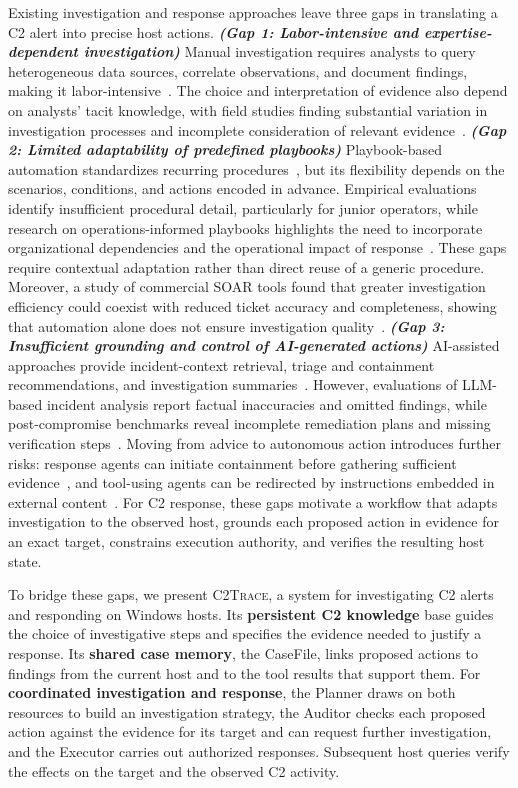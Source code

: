 \documentclass[pdflatex,sn-basic]{sn-jnl}
\newcommand{\system}{\textsc{C2Trace}\xspace}
\begin{document}
Existing investigation and response approaches leave three gaps in translating a C2 alert into precise host actions. \textbf{\textit{(Gap 1: Labor-intensive and expertise-dependent investigation)}} Manual investigation requires analysts to query heterogeneous data sources, correlate observations, and document findings, making it labor-intensive~\citep{bridges2023}. The choice and interpretation of evidence also depend on analysts' tacit knowledge, with field studies finding substantial variation in investigation processes and incomplete consideration of relevant evidence~\citep{kersten2023structure,kersten2025field}. \textbf{\textit{(Gap 2: Limited adaptability of predefined playbooks)}} Playbook-based automation standardizes recurring procedures~\citep{cacao2023}, but its flexibility depends on the scenarios, conditions, and actions encoded in advance. Empirical evaluations identify insufficient procedural detail, particularly for junior operators, while research on operations-informed playbooks highlights the need to incorporate organizational dependencies and the operational impact of response~\citep{stevens2022ready,shaked2023operations}. These gaps require contextual adaptation rather than direct reuse of a generic procedure. Moreover, a study of commercial SOAR tools found that greater investigation efficiency could coexist with reduced ticket accuracy and completeness, showing that automation alone does not ensure investigation quality~\citep{bridges2023}. \textbf{\textit{(Gap 3: Insufficient grounding and control of AI-generated actions)}} AI-assisted approaches provide incident-context retrieval, triage and containment recommendations, and investigation summaries~\citep{guided-response2025,kramer2025}. However, evaluations of LLM-based incident analysis report factual inaccuracies and omitted findings, while post-compromise benchmarks reveal incomplete remediation plans and missing verification steps~\citep{kramer2025,secrespond2026}. Moving from advice to autonomous action introduces further risks: response agents can initiate containment before gathering sufficient evidence~\citep{opensec2026}, and tool-using agents can be redirected by instructions embedded in external content~\citep{agentdojo2024,injecagent2024}. For C2 response, these gaps motivate a workflow that adapts investigation to the observed host, grounds each proposed action in evidence for an exact target, constrains execution authority, and verifies the resulting host state.

To bridge these gaps, we present \system, a system for investigating C2 alerts and responding on Windows hosts. Its \textbf{persistent C2 knowledge} base guides the choice of investigative steps and specifies the evidence needed to justify a response. Its \textbf{shared case memory}, the CaseFile, links proposed actions to findings from the current host and to the tool results that support them. For \textbf{coordinated investigation and response}, the Planner draws on both resources to build an investigation strategy, the Auditor checks each proposed action against the evidence for its target and can request further investigation, and the Executor carries out authorized responses. Subsequent host queries verify the effects on the target and the observed C2 activity.
\end{document}
